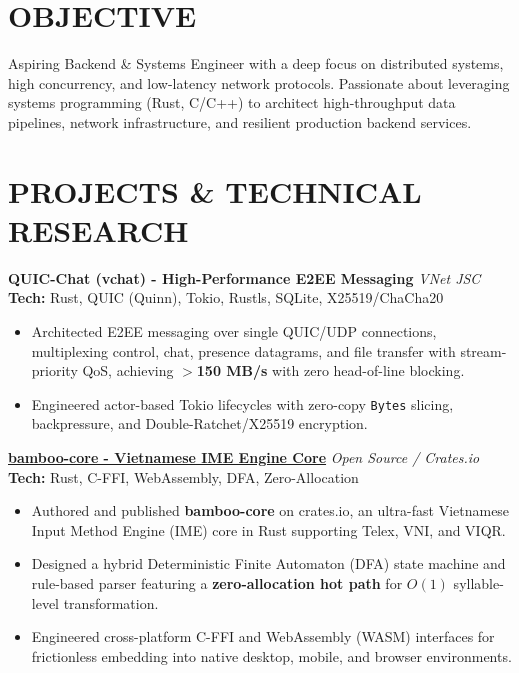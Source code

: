 \documentclass[10pt,a4paper]{article}
\newcommand{\project}[3]{
    {\normalsize\textbf{#1}} \hfill {\footnotesize\textit{#2}} \\
    {\footnotesize\textbf{Tech: }#3} \vspace{2pt}
}
\begin{document}
\begin{minipage}[t]{0.66\textwidth}

    \section*{OBJECTIVE}
    Aspiring Backend \& Systems Engineer with a deep focus on distributed systems, high concurrency, and low-latency network protocols. Passionate about leveraging systems programming (Rust, C/C++) to architect high-throughput data pipelines, network infrastructure, and resilient production backend services.

    \section*{PROJECTS \& TECHNICAL RESEARCH}

    \project{QUIC-Chat (vchat) - High-Performance E2EE Messaging}{VNet JSC}{Rust, QUIC (Quinn), Tokio, Rustls, SQLite, X25519/ChaCha20}
    \begin{itemize}
        \item Architected E2EE messaging over single QUIC/UDP connections, multiplexing control, chat, presence datagrams, and file transfer with stream-priority QoS, achieving \textbf{$>$150 MB/s} with zero head-of-line blocking.
        \item Engineered actor-based Tokio lifecycles with zero-copy \texttt{Bytes} slicing, backpressure, and Double-Ratchet/X25519 encryption.
    \end{itemize}
    \vspace{0.15cm}

    \project{\href{https://crates.io/crates/bamboo-core}{bamboo-core - Vietnamese IME Engine Core}}{Open Source / Crates.io}{Rust, C-FFI, WebAssembly, DFA, Zero-Allocation}
    \begin{itemize}
        \item Authored and published \textbf{bamboo-core} on crates.io, an ultra-fast Vietnamese Input Method Engine (IME) core in Rust supporting Telex, VNI, and VIQR.
        \item Designed a hybrid Deterministic Finite Automaton (DFA) state machine and rule-based parser featuring a \textbf{zero-allocation hot path} for $O(1)$ syllable-level transformation.
        \item Engineered cross-platform C-FFI and WebAssembly (WASM) interfaces for frictionless embedding into native desktop, mobile, and browser environments.
    \end{itemize}
    \vspace{0.15cm}


\end{minipage}
\end{document}
